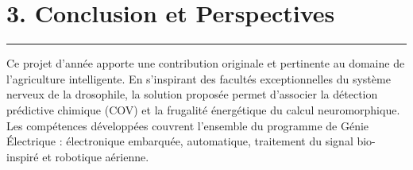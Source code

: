 \documentclass[11pt,a4paper]{article}
\begin{document}
\section*{\color{primaryblue}3. Conclusion et Perspectives}
\hrule
\vspace{0.3cm}
Ce projet d'année apporte une contribution originale et pertinente au domaine de l'agriculture intelligente. En s'inspirant des facultés exceptionnelles du système nerveux de la drosophile, la solution proposée permet d'associer la détection prédictive chimique (COV) et la frugalité énergétique du calcul neuromorphique. Les compétences développées couvrent l'ensemble du programme de Génie Électrique : électronique embarquée, automatique, traitement du signal bio-inspiré et robotique aérienne.
\end{document}
